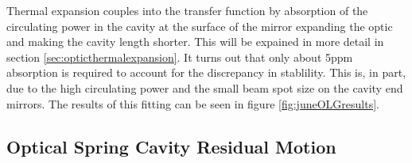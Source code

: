 Thermal expansion couples into the transfer function by absorption of the
circulating power in the cavity at the surface of the mirror expanding the
optic and making the cavity length shorter.
This will be expained in more detail in section
\ref{sec:opticthermalexpansion}.
It turns out that only about 5ppm absorption is required to account for the
discrepancy in stablility.
This is, in part, due to the high circulating power and the small
beam spot size on the cavity end mirrors.
The results of this fitting can be seen in figure \ref{fig:juneOLGresults}.

\subsection{Optical Spring Cavity Residual Motion}

